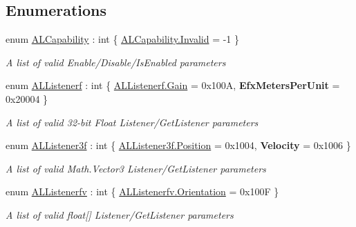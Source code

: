 \subsection*{Enumerations}
\begin{DoxyCompactItemize}
\item 
enum \hyperlink{namespace_open_t_k_1_1_audio_1_1_open_a_l_a94cd47e72b09f01500f6f820b2d1387f}{A\-L\-Capability} \-: int \{ \hyperlink{namespace_open_t_k_1_1_audio_1_1_open_a_l_a94cd47e72b09f01500f6f820b2d1387fa4bbb8f967da6d1a610596d7257179c2b}{A\-L\-Capability.\-Invalid} = -\/1
 \}
\begin{DoxyCompactList}\small\item\em A list of valid Enable/\-Disable/\-Is\-Enabled parameters\end{DoxyCompactList}\item 
enum \hyperlink{namespace_open_t_k_1_1_audio_1_1_open_a_l_a5bff3bb283f0f410f16305a3dcdb808b}{A\-L\-Listenerf} \-: int \{ \hyperlink{namespace_open_t_k_1_1_audio_1_1_open_a_l_a5bff3bb283f0f410f16305a3dcdb808ba35d72fa7d84f4ae67d705373d1d44b88}{A\-L\-Listenerf.\-Gain} = 0x100\-A, 
{\bfseries Efx\-Meters\-Per\-Unit} = 0x20004
 \}
\begin{DoxyCompactList}\small\item\em A list of valid 32-\/bit Float Listener/\-Get\-Listener parameters\end{DoxyCompactList}\item 
enum \hyperlink{namespace_open_t_k_1_1_audio_1_1_open_a_l_aa9b3b935789dc118d03b512d09cc629d}{A\-L\-Listener3f} \-: int \{ \hyperlink{namespace_open_t_k_1_1_audio_1_1_open_a_l_aa9b3b935789dc118d03b512d09cc629da52f5e0bc3859bc5f5e25130b6c7e8881}{A\-L\-Listener3f.\-Position} = 0x1004, 
{\bfseries Velocity} = 0x1006
 \}
\begin{DoxyCompactList}\small\item\em A list of valid Math.\-Vector3 Listener/\-Get\-Listener parameters\end{DoxyCompactList}\item 
enum \hyperlink{namespace_open_t_k_1_1_audio_1_1_open_a_l_a3efa5ef6cd34b51a9c1bb311a40e9b12}{A\-L\-Listenerfv} \-: int \{ \hyperlink{namespace_open_t_k_1_1_audio_1_1_open_a_l_a3efa5ef6cd34b51a9c1bb311a40e9b12aabbd64f40c34c537d3a571af068fce29}{A\-L\-Listenerfv.\-Orientation} = 0x100\-F
 \}
\begin{DoxyCompactList}\small\item\em A list of valid float\mbox{[}\mbox{]} Listener/\-Get\-Listener parameters\end{DoxyCompactList}\item 

\end{DoxyCompactItemize}
